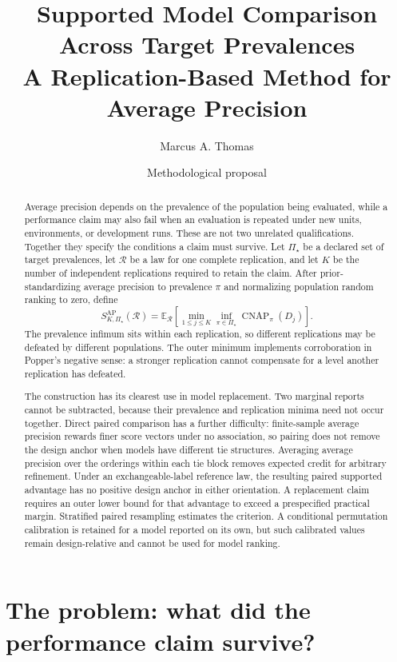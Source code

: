 \documentclass[11pt]{article}
\title{Supported Model Comparison Across Target Prevalences\\
\large A Replication-Based Method for Average Precision}
\author{Marcus A. Thomas}
\date{Methodological proposal}
\newcommand{\CNAP}{\operatorname{CNAP}}
\newcommand{\Regime}{\mathcal{R}}
\newcommand{\PSet}{\Pi_\star}
\newcommand{\E}{\mathbb{E}}
\theoremstyle{remark}
\begin{document}
\maketitle

\begin{abstract}
Average precision depends on the prevalence of the population being evaluated, while a performance claim may also fail when an evaluation is repeated under new units, environments, or development runs. These are not two unrelated qualifications. Together they specify the conditions a claim must survive. Let $\PSet$ be a declared set of target prevalences, let $\Regime$ be a law for one complete replication, and let $K$ be the number of independent replications required to retain the claim. After prior-standardizing average precision to prevalence $\pi$ and normalizing population random ranking to zero, define
\[
S_{K,\PSet}^{\mathrm{AP}}(\Regime)
=
\E_{\Regime}\left[
\min_{1\leq j\leq K}
\inf_{\pi\in\PSet}\CNAP_\pi(D_j)
\right].
\]
The prevalence infimum sits within each replication, so different replications may be defeated by different populations. The outer minimum implements corroboration in Popper's negative sense: a stronger replication cannot compensate for a level another replication has defeated.

The construction has its clearest use in model replacement. Two marginal reports cannot be subtracted, because their prevalence and replication minima need not occur together. Direct paired comparison has a further difficulty: finite-sample average precision rewards finer score vectors under no association, so pairing does not remove the design anchor when models have different tie structures. Averaging average precision over the orderings within each tie block removes expected credit for arbitrary refinement. Under an exchangeable-label reference law, the resulting paired supported advantage has no positive design anchor in either orientation. A replacement claim requires an outer lower bound for that advantage to exceed a prespecified practical margin. Stratified paired resampling estimates the criterion. A conditional permutation calibration is retained for a model reported on its own, but such calibrated values remain design-relative and cannot be used for model ranking.
\end{abstract}

\section{The problem: what did the performance claim survive?}
\label{sec:introduction}
\end{document}
